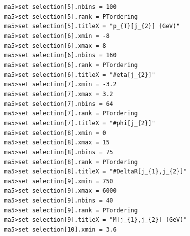 \documentclass[a4paper, 10pt]{article}
\begin{document}
\texttt{ }\texttt{ }\texttt{ma5>set selection[5].nbins = 100\\
}
\texttt{ }\texttt{ }\texttt{ma5>set selection[5].rank = PTordering\\
}
\texttt{ }\texttt{ }\texttt{ma5>set selection[5].titleX = "p\_\{T\}[j\_\{2\}] (GeV)"\\
}
\texttt{ }\texttt{ }\texttt{ma5>set selection[6].xmin = -8\\
}
\texttt{ }\texttt{ }\texttt{ma5>set selection[6].xmax = 8\\
}
\texttt{ }\texttt{ }\texttt{ma5>set selection[6].nbins = 160\\
}
\texttt{ }\texttt{ }\texttt{ma5>set selection[6].rank = PTordering\\
}
\texttt{ }\texttt{ }\texttt{ma5>set selection[6].titleX = "\#eta[j\_\{2\}]"\\
}
\texttt{ }\texttt{ }\texttt{ma5>set selection[7].xmin = -3.2\\
}
\texttt{ }\texttt{ }\texttt{ma5>set selection[7].xmax = 3.2\\
}
\texttt{ }\texttt{ }\texttt{ma5>set selection[7].nbins = 64\\
}
\texttt{ }\texttt{ }\texttt{ma5>set selection[7].rank = PTordering\\
}
\texttt{ }\texttt{ }\texttt{ma5>set selection[7].titleX = "\#phi[j\_\{2\}]"\\
}
\texttt{ }\texttt{ }\texttt{ma5>set selection[8].xmin = 0\\
}
\texttt{ }\texttt{ }\texttt{ma5>set selection[8].xmax = 15\\
}
\texttt{ }\texttt{ }\texttt{ma5>set selection[8].nbins = 75\\
}
\texttt{ }\texttt{ }\texttt{ma5>set selection[8].rank = PTordering\\
}
\texttt{ }\texttt{ }\texttt{ma5>set selection[8].titleX = "\#DeltaR[j\_\{1\},j\_\{2\}]"\\
}
\texttt{ }\texttt{ }\texttt{ma5>set selection[9].xmin = 750\\
}
\texttt{ }\texttt{ }\texttt{ma5>set selection[9].xmax = 6000\\
}
\texttt{ }\texttt{ }\texttt{ma5>set selection[9].nbins = 40\\
}
\texttt{ }\texttt{ }\texttt{ma5>set selection[9].rank = PTordering\\
}
\texttt{ }\texttt{ }\texttt{ma5>set selection[9].titleX = "M[j\_\{1\},j\_\{2\}] (GeV)"\\
}
\texttt{ }\texttt{ }\texttt{ma5>set selection[10].xmin = 3.6\\
}
\end{document}
